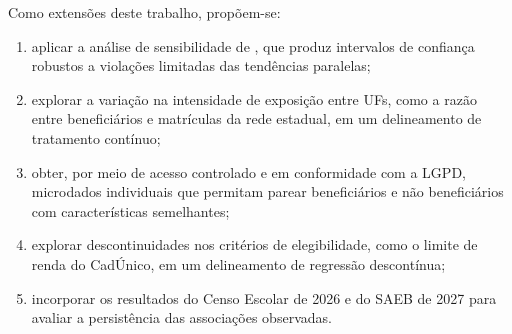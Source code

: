 Como extensões deste trabalho, propõem-se:

\begin{enumerate}
    \item aplicar a análise de sensibilidade de , que produz intervalos de confiança robustos a violações limitadas das tendências paralelas;
    \item explorar a variação na intensidade de exposição entre UFs, como a razão entre beneficiários e matrículas da rede estadual, em um delineamento de tratamento contínuo;
    \item obter, por meio de acesso controlado e em conformidade com a LGPD, microdados individuais que permitam parear beneficiários e não beneficiários com características semelhantes;
    \item explorar descontinuidades nos critérios de elegibilidade, como o limite de renda do CadÚnico, em um delineamento de regressão descontínua;
    \item incorporar os resultados do Censo Escolar de 2026 e do SAEB de 2027 para avaliar a persistência das associações observadas.
\end{enumerate}
